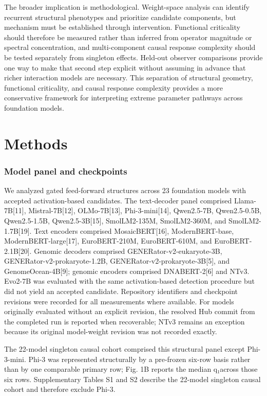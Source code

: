 \documentclass[11pt]{article}
\begin{document}
The broader implication is methodological. Weight-space analysis can identify recurrent structural phenotypes and prioritize candidate components, but mechanism must be established through intervention. Functional criticality should therefore be measured rather than inferred from operator magnitude or spectral concentration, and multi-component causal response complexity should be tested separately from singleton effects. Held-out observer comparisons provide one way to make that second step explicit without assuming in advance that richer interaction models are necessary. This separation of structural geometry, functional criticality, and causal response complexity provides a more conservative framework for interpreting extreme parameter pathways across foundation models.

\section*{Methods}
\subsubsection*{Model panel and checkpoints}
We analyzed gated feed-forward structures across 23 foundation models with accepted activation-based candidates. The text-decoder panel comprised Llama-7B[11], Mistral-7B[12], OLMo-7B[13], Phi-3-mini[14], Qwen2.5-7B, Qwen2.5-0.5B, Qwen2.5-1.5B, Qwen2.5-3B[15], SmolLM2-135M, SmolLM2-360M, and SmolLM2-1.7B[19]. Text encoders comprised MosaicBERT[16], ModernBERT-base, ModernBERT-large[17], EuroBERT-210M, EuroBERT-610M, and EuroBERT-2.1B[20]. Genomic decoders comprised GENERator-v2-eukaryote-3B, GENERator-v2-prokaryote-1.2B, GENERator-v2-prokaryote-3B[5], and GenomeOcean-4B[9]; genomic encoders comprised DNABERT-2[6] and NTv3. Evo2-7B was evaluated with the same activation-based detection procedure but did not yield an accepted candidate. Repository identifiers and checkpoint revisions were recorded for all measurements where available. For models originally evaluated without an explicit revision, the resolved Hub commit from the completed run is reported when recoverable; NTv3 remains an exception because its original model-weight revision was not recorded exactly.

The 22-model singleton causal cohort comprised this structural panel except Phi-3-mini. Phi-3 was represented structurally by a pre-frozen six-row basis rather than by one comparable primary row; Fig. 1B reports the median q₁across those six rows. Supplementary Tables S1 and S2 describe the 22-model singleton causal cohort and therefore exclude Phi-3.
\end{document}

